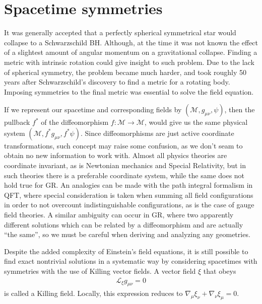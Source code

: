 \section{Spacetime symmetries}

It was generally accepted that a perfectly spherical symmetrical star would collapse to a Schwarzschild BH. 
Although, at the time it was not known the effect of a slightest amount of angular momentum on a gravitational collapse.
Finding a metric with intrinsic rotation could give insight to such problem. Due to the lack of spherical symmetry, the problem became much harder, and took roughly 50 years after Schwarzschild's discovery to find a metric for a rotating body.
Imposing symmetries to the final metric was essential to solve the field equation.

If we represent our spacetime and corresponding fields by $(\mathscr{M}, g_{\mu\nu}, \psi)$, then the pullback $f^*$ of the diffeomorphism $f:\mathscr{M}\rightarrow\mathscr{M}$, would give us the same physical system $(\mathscr{M}, f^* g_{\mu\nu}, f^* \psi)$.
Since diffeomorphisms are just active coordinate transformations, such concept may raise some confusion, as we don't seam to obtain no new information to work with. 
Almost all physics theories are coordinate invariant, as is Newtonian mechanics and Special Relativity, but in such theories there is a preferable coordinate system, while the same does not hold true for GR.
An analogies can be made with the path integral formalism in QFT, where special consideration is taken when summing all field configurations in order to not overcount indistinguishable configurations, as is the case of gauge field theories.
A similar ambiguity can occur in GR, where two apparently different solutions which can be related by a diffeomorphism and are actually ``the same'', so we must be careful when deriving and analyzing any geometries.

Despite the added complexity of Einstein's field equations, it is still possible to find exact nontrivial solutions in a systematic way by considering spacetimes with symmetries with the use of Killing vector fields.
A vector field $\xi$ that obeys
\begin{align}
    \mathscr{L}_\xi  g_{\mu\nu} = 0  
    \label{eq2:killing}
\end{align}
is called a Killing field. Locally, this expression reduces to $\nabla_\mu \xi_\nu + \nabla_\nu \xi_\mu = 0$.


